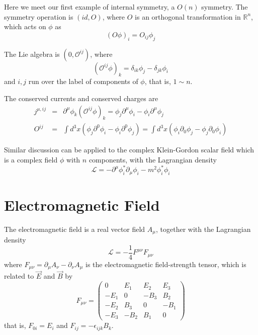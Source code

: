 \documentclass[12pt]{book}
\begin{document}
	
	Here we meet our first example of internal symmetry, a $O(n)$ symmetry. The symmetry operation is $(id,O)$, where $O$ is an orthogonal transformation in $\mathbb R^n$, which acts on $\phi$ as
	\begin{equation}
		(O\phi)_i=O_{ij}\phi_j
	\end{equation}
	
	The Lie algebra is $(0,\mathcal O^{ij})$, where
	\begin{equation}
		(\mathcal O^{ij}\phi)_k=\delta_{ik}\phi_j-\delta_{jk}\phi_i
	\end{equation}
	and $i,j$ run over the label of components of $\phi$, that is, $1\sim n$.
	
	The conserved currents and conserved charges are 	
	\begin{eqnarray}
		j^{\mu,ij}&=&\partial^\mu\phi_k(\mathcal O^{ij}\phi)_k=\phi_j\partial^\mu\phi_i-\phi_i\partial^\mu\phi_j\\
		O^{ij}&=&\int d^3x(\phi_j\partial^0\phi_i-\phi_i\partial^0\phi_j)=\int d^3x(\phi_i\partial_0\phi_j-\phi_j\partial_0\phi_i)
	\end{eqnarray}
	
	Similar discussion can be applied to the complex Klein-Gordon scalar field which is a complex field $\phi$ with $n$ components, with the Lagrangian density
		\begin{equation}
			\mathcal L=-\partial^\mu\phi_i^*\partial_\mu\phi_i-m^2\phi_i^*\phi_i
		\end{equation}	
	
	\section{Electromagnetic Field}
	The electromagnetic field is a real vector field $A_\mu$, together with the Lagrangian density
	\begin{equation}
		\mathcal L=-\frac 14F^{\mu\nu}F_{\mu\nu}
	\end{equation}
	where $F_{\mu\nu}=\partial_\mu A_\nu-\partial_\nu A_\mu$ is the electromagnetic field-strength tensor, which is related to $\vec E$ and $\vec B$ by
	\begin{equation}
		F_{\mu\nu}=
		\left( \begin{array}{cccc}
		0 & E_1 & E_2 & E_3 \\
		-E_1& 0 & -B_3 & B_2 \\
		-E_2& B_3 & 0 & -B_1 \\
		-E_3& -B_2 & B_1 & 0
		\end{array} \right)
	\end{equation}
	that is, $F_{0i}=E_i$ and $F_{ij}=-\epsilon_{ijk}B_k$.
	
\end{document}

